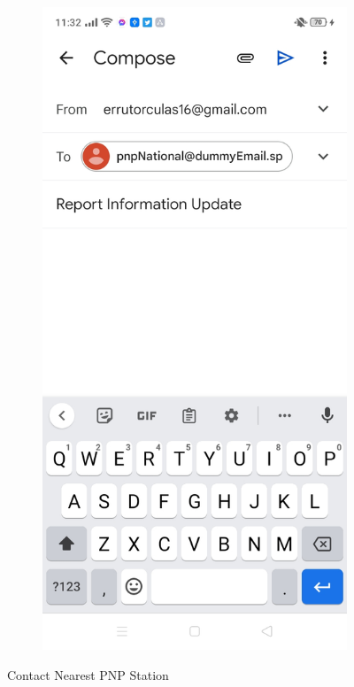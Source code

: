 \begin{figure}[!h]
\begin{subfigure}[c]{0.30\linewidth}
    \end{subfigure}
    \centering
    \begin{subfigure}[c]{0.30\linewidth}
        \centering
        \includegraphics[scale=0.15]{figures/Chapter4/Main/EmailPNP.jpg}
    \end{subfigure}
    \caption{Contact Nearest PNP Station}
    \label{fig:contactPNP}
\end{figure}


